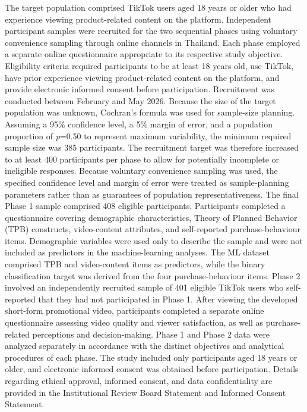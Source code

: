 \documentclass[jtaer,article,submit,moreauthors]{Definitions/mdpi}
\begin{document}
The target population comprised TikTok users aged 18 years or older who had experience viewing product-related content on the platform. Independent participant samples were recruited for the two sequential phases using voluntary convenience sampling through online channels in Thailand. Each phase employed a separate online questionnaire appropriate to its respective study objective.
Eligibility criteria required participants to be at least 18 years old, use TikTok, have prior experience viewing product-related content on the platform, and provide electronic informed consent before participation. Recruitment was conducted between February and May 2026.
Because the size of the target population was unknown, Cochran's formula was used for sample-size planning. Assuming a 95\% confidence level, a 5\% margin of error, and a population proportion of \textit{p}=0.50 to represent maximum variability, the minimum required sample size was 385 participants. The recruitment target was therefore increased to at least 400 participants per phase to allow for potentially incomplete or ineligible responses. Because voluntary convenience sampling was used, the specified confidence level and margin of error were treated as sample-planning parameters rather than as guarantees of population representativeness.
The final Phase 1 sample comprised 408 eligible participants. Participants completed a questionnaire covering demographic characteristics, Theory of Planned Behavior (TPB) constructs, video-content attributes, and self-reported purchase-behaviour items. Demographic variables were used only to describe the sample and were not included as predictors in the machine-learning analyses. The ML dataset comprised TPB and video-content items as predictors, while the binary classification target was derived from the four purchase-behaviour items.
Phase 2 involved an independently recruited sample of 401 eligible TikTok users who self-reported that they had not participated in Phase 1. After viewing the developed short-form promotional video, participants completed a separate online questionnaire assessing video quality and viewer satisfaction, as well as purchase-related perceptions and decision-making. Phase 1 and Phase 2 data were analyzed separately in accordance with the distinct objectives and analytical procedures of each phase.
The study included only participants aged 18 years or older, and electronic informed consent was obtained before participation. Details regarding ethical approval, informed consent, and data confidentiality are provided in the Institutional Review Board Statement and Informed Consent Statement.
\end{document}
